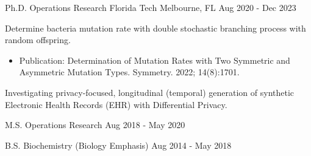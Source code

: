 \vspace{-5mm}
\vspace{-2mm}

\begin{cventries}
	\cventry
	{Ph.D. Operations Research}
	{Florida Tech}
	{Melbourne, FL}
	{Aug 2020 - Dec 2023}
	{\begin{cvitems}
			\item {Determine bacteria mutation rate with double stochastic branching process with random offspring.
			            \begin{itemize}
				            \item {Publication: Determination of Mutation Rates with Two Symmetric and Asymmetric Mutation Types. Symmetry. 2022; 14(8):1701.}
			            \end{itemize}}
			\item {Investigating privacy-focused, longitudinal (temporal) generation of synthetic Electronic Health Records (EHR) with Differential Privacy.}
		\end{cvitems}}

	\vspace{-2mm}

	\cventry
	{M.S. Operations Research}
	{}
	{}
	{Aug 2018 - May 2020}
	{}
	\vspace{-6.5mm}

	\cventry
	{B.S. Biochemistry (Biology Emphasis)}
	{}
	{}
	{Aug 2014 - May 2018}
	{}
	\vspace{-6mm}

\end{cventries}